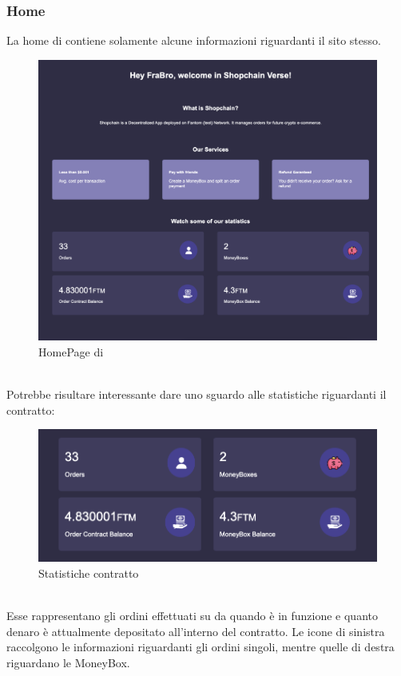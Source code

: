         \subsubsection{Home}
        La home di \projectName{} contiene solamente alcune informazioni riguardanti il sito stesso.
        \begin{figure}[H]
            \centering
            \includegraphics[scale=0.3]{immagini/Home.png}
            \caption{HomePage di \projectName{}}
        \end{figure}
        \textbf{}\\
        Potrebbe risultare interessante dare uno sguardo alle statistiche riguardanti il contratto:
        \begin{figure}[H]
            \centering
            \includegraphics[scale=0.4]{immagini/ContractDetails.png}
            \caption{Statistiche contratto}
        \end{figure}
        \textbf{}\\
        Esse rappresentano gli ordini effettuati su \projectName{} da quando è in funzione e quanto denaro è attualmente depositato all'interno del contratto. Le icone di sinistra raccolgono le informazioni riguardanti gli ordini singoli, mentre quelle di destra riguardano le MoneyBox.
